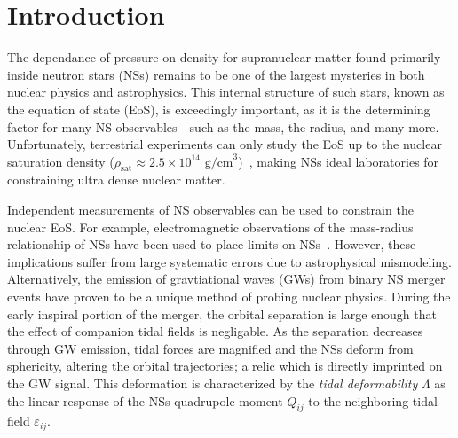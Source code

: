 \documentclass[prd,twocolumn,nofootinbib,superscriptaddress,amsmath,amssymb]{revtex4-1}
\begin{document}
\maketitle


\section{Introduction}\label{sec:intro}
The dependance of pressure on density for supranuclear matter found primarily inside neutron stars (NSs) remains to be one of the largest mysteries in both nuclear physics and astrophysics.
This internal structure of such stars, known as the equation of state (EoS), is exceedingly important, as it is the determining factor for many NS observables - such as the mass, the radius, and many more.
Unfortunately, terrestrial experiments can only study the EoS up to the nuclear saturation density ($\rho_{\text{sat}} \approx 2.5 \times 10^{14} \text{ g/cm}^3$)~\cite{Li:HeavyIon,Tsang:SymmetryEnergy,Centelles:NeutronSkin,Li:CrossSections,Chen:SymEnergy}, making NSs ideal laboratories for constraining ultra dense nuclear matter.

Independent measurements of NS observables can be used to constrain the nuclear EoS.
For example, electromagnetic observations of the mass-radius relationship of NSs have been used to place limits on NSs~\cite{guver,ozel-baym-guver,steiner-lattimer-brown,Lattimer2014,Ozel:2016oaf}.
However, these implications suffer from large systematic errors due to astrophysical mismodeling.
Alternatively, the emission of gravtiational waves (GWs) from binary NS merger events have proven to be a unique method of probing nuclear physics.
During the early inspiral portion of the merger, the orbital separation is large enough that the effect of companion tidal fields is negligable. 
As the separation decreases through GW emission, tidal forces are magnified and the NSs deform from sphericity, altering the orbital trajectories; a relic which is directly imprinted on the GW signal.
This deformation is characterized by the \textit{tidal deformability} $\Lambda$ as the linear response of the NSs quadrupole moment $Q_{ij}$ to the neighboring tidal field $\varepsilon_{ij}$.
\end{document}
